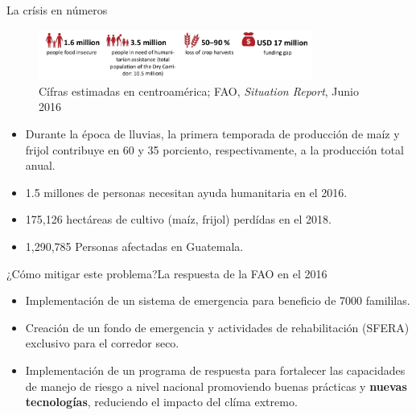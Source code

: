 \documentclass[]{beamer}
\begin{document}
\begin{frame}{La crísis en números}
    \begin{figure}
        \centering
        \includegraphics[width=0.8\textwidth]{Docs/cs_in_numbers}
        \caption{Cífras estimadas en centroamérica;  FAO, \textit{Situation Report}, Junio 2016}
        \label{fig:my_label}
    \end{figure}
    \begin{itemize}
      \item Durante la época de lluvias, la primera temporada de producción de maíz y frijol contribuye en 60 y 35 porciento, respectivamente, a la producción total anual.
      \item 1.5 millones de personas necesitan ayuda humanitaria en el 2016. %
      \item 175,126 hectáreas de cultivo (maíz, frijol) perdídas en el 2018. %
      \item 1,290,785 Personas afectadas en Guatemala. %
    \end{itemize}
\end{frame}

\begin{frame}{¿Cómo mitigar este problema?}{La respuesta de la FAO en el 2016}
      \begin{itemize}
        \item Implementación de un sistema de emergencia  para beneficio de 7000 famililas.
        \item Creación de un fondo de emergencia y actividades de rehabilitación (SFERA) exclusivo para el corredor seco.
        \item Implementación de un programa de respuesta para fortalecer las capacidades de manejo de riesgo a nivel nacional promoviendo buenas prácticas y \textbf{nuevas tecnologías}, reduciendo el impacto del clíma extremo.
      \end{itemize}

\end{frame}
\end{document}
